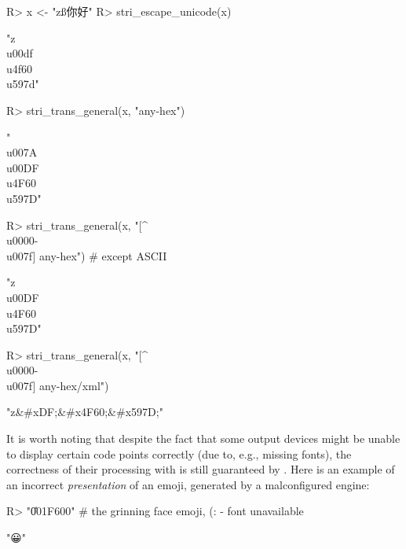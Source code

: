 \documentclass[nojss]{jss}
\begin{document}
\begin{Schunk}
\begin{Sinput}
R> x <- "zß你好"
R> stri_escape_unicode(x)
\end{Sinput}
\begin{Soutput}
[1] "z\\u00df\\u4f60\\u597d"
\end{Soutput}
\begin{Sinput}
R> stri_trans_general(x, "any-hex")
\end{Sinput}
\begin{Soutput}
[1] "\\u007A\\u00DF\\u4F60\\u597D"
\end{Soutput}
\begin{Sinput}
R> stri_trans_general(x, "[^\\u0000-\\u007f] any-hex") # except ASCII
\end{Sinput}
\begin{Soutput}
[1] "z\\u00DF\\u4F60\\u597D"
\end{Soutput}
\begin{Sinput}
R> stri_trans_general(x, "[^\\u0000-\\u007f] any-hex/xml")
\end{Sinput}
\begin{Soutput}
[1] "z&#xDF;&#x4F60;&#x597D;"
\end{Soutput}
\end{Schunk}


\bigskip
It is worth noting that despite the fact that some output devices
might be unable to display certain code points correctly
(due to, e.g., missing fonts), the correctness of their
processing with  is still guaranteed by .
Here is an example of an incorrect \textit{presentation} of an emoji,
generated by a malconfigured \XeLaTeX{} engine:

\begin{Schunk}
\begin{Sinput}
R> "\U001F600" # the grinning face emoji, (:               - font unavailable
\end{Sinput}
\begin{Soutput}
[1] "😀"
\end{Soutput}
\end{Schunk}
\end{document}
